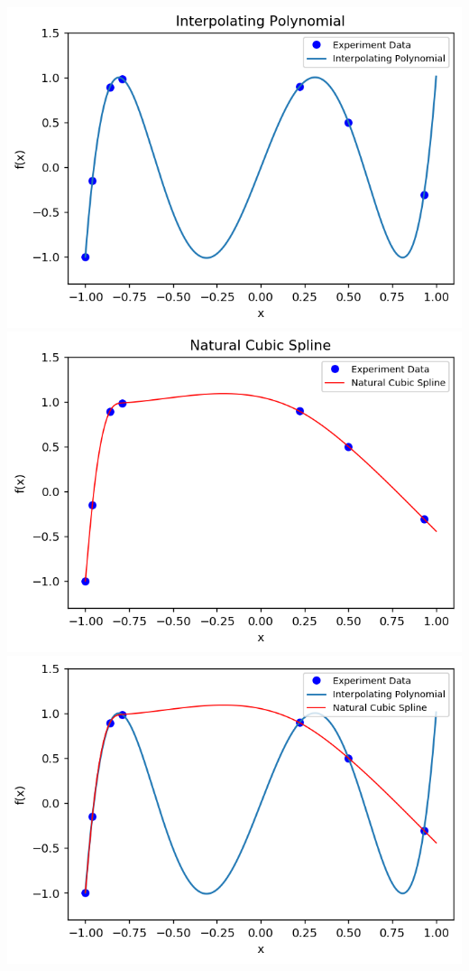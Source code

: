 \documentclass{article}
\begin{document}
\includegraphics[width=\textwidth,height=\textheight,keepaspectratio]{lagrange.png}
\includegraphics[width=\textwidth,height=\textheight,keepaspectratio]{nspline.png}
\includegraphics[width=\textwidth,height=\textheight,keepaspectratio]{together.png}
\end{document}
